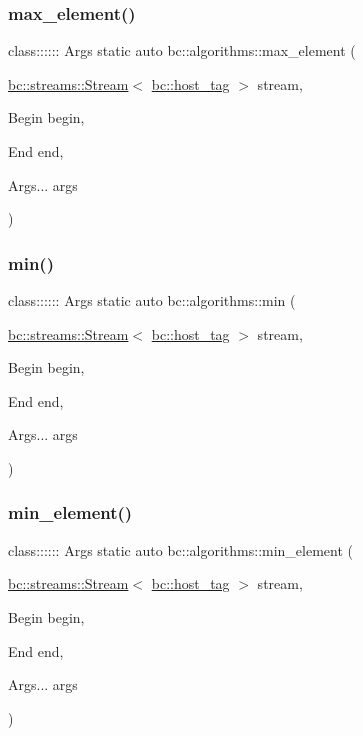 \subsubsection{\texorpdfstring{max\+\_\+element()}{max\_element()}}
{\footnotesize\ttfamily class\+:::::: Args static auto bc\+::algorithms\+::max\+\_\+element (\begin{DoxyParamCaption}\item[{\hyperlink{classbc_1_1streams_1_1Stream}{bc\+::streams\+::\+Stream}$<$ \hyperlink{structbc_1_1host__tag}{bc\+::host\+\_\+tag} $>$}]{stream,  }\item[{Begin}]{begin,  }\item[{End}]{end,  }\item[{Args...}]{args }\end{DoxyParamCaption})}

\mbox{\label{namespacebc_1_1algorithms_a46bd0046dd7009497caf765c7a035cc3}} 
\subsubsection{\texorpdfstring{min()}{min()}}
{\footnotesize\ttfamily class\+:::::: Args static auto bc\+::algorithms\+::min (\begin{DoxyParamCaption}\item[{\hyperlink{classbc_1_1streams_1_1Stream}{bc\+::streams\+::\+Stream}$<$ \hyperlink{structbc_1_1host__tag}{bc\+::host\+\_\+tag} $>$}]{stream,  }\item[{Begin}]{begin,  }\item[{End}]{end,  }\item[{Args...}]{args }\end{DoxyParamCaption})}

\mbox{\label{namespacebc_1_1algorithms_a79de57ecdb13600a50218db36c1e8102}} 
\subsubsection{\texorpdfstring{min\+\_\+element()}{min\_element()}}
{\footnotesize\ttfamily class\+:::::: Args static auto bc\+::algorithms\+::min\+\_\+element (\begin{DoxyParamCaption}\item[{\hyperlink{classbc_1_1streams_1_1Stream}{bc\+::streams\+::\+Stream}$<$ \hyperlink{structbc_1_1host__tag}{bc\+::host\+\_\+tag} $>$}]{stream,  }\item[{Begin}]{begin,  }\item[{End}]{end,  }\item[{Args...}]{args }\end{DoxyParamCaption})}

